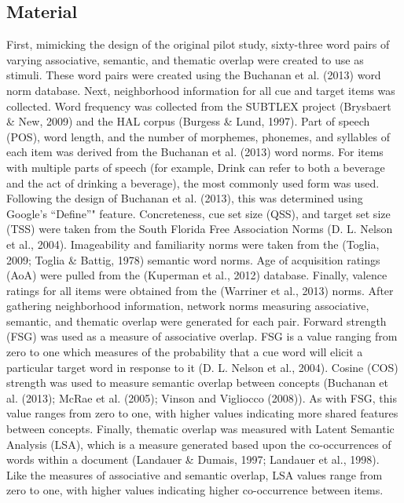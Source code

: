 \documentclass[english,man]{apa6}
\theoremstyle{definition}
\theoremstyle{definition}
\theoremstyle{definition}
\theoremstyle{remark}
\begin{document}
\subsection{Material}\label{material}

First, mimicking the design of the original pilot study, sixty-three
word pairs of varying associative, semantic, and thematic overlap were
created to use as stimuli. These word pairs were created using the
Buchanan et al. (2013) word norm database. Next, neighborhood
information for all cue and target items was collected. Word frequency
was collected from the SUBTLEX project (Brysbaert \& New, 2009) and the
HAL corpus (Burgess \& Lund, 1997). Part of speech (POS), word length,
and the number of morphemes, phonemes, and syllables of each item was
derived from the Buchanan et al. (2013) word norms. For items with
multiple parts of speech (for example, Drink can refer to both a
beverage and the act of drinking a beverage), the most commonly used
form was used. Following the design of Buchanan et al. (2013), this was
determined using Google's \enquote{Define}" feature. Concreteness, cue
set size (QSS), and target set size (TSS) were taken from the South
Florida Free Association Norms (D. L. Nelson et al., 2004). Imageability
and familiarity norms were taken from the (Toglia, 2009; Toglia \&
Battig, 1978) semantic word norms. Age of acquisition ratings (AoA) were
pulled from the (Kuperman et al., 2012) database. Finally, valence
ratings for all items were obtained from the (Warriner et al., 2013)
norms. After gathering neighborhood information, network norms measuring
associative, semantic, and thematic overlap were generated for each
pair. Forward strength (FSG) was used as a measure of associative
overlap. FSG is a value ranging from zero to one which measures of the
probability that a cue word will elicit a particular target word in
response to it (D. L. Nelson et al., 2004). Cosine (COS) strength was
used to measure semantic overlap between concepts (Buchanan et al.
(2013); McRae et al. (2005); Vinson and Vigliocco (2008)). As with FSG,
this value ranges from zero to one, with higher values indicating more
shared features between concepts. Finally, thematic overlap was measured
with Latent Semantic Analysis (LSA), which is a measure generated based
upon the co-occurrences of words within a document (Landauer \& Dumais,
1997; Landauer et al., 1998). Like the measures of associative and
semantic overlap, LSA values range from zero to one, with higher values
indicating higher co-occurrence between items.
\end{document}
